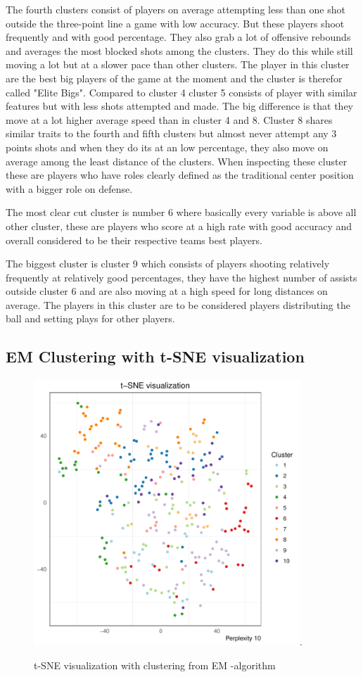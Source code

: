 \documentclass{article}
\begin{document}
The fourth clusters consist of players on average attempting less than one shot outside the three-point line a game with low accuracy. But these players shoot frequently and with good percentage. They also grab a lot of offensive rebounds and averages the most blocked shots among the clusters. They do this while still moving a lot but at a slower pace than other clusters. The player in this cluster are the best big players of the game at the moment and the cluster is therefor called "Elite Bigs". Compared to cluster 4 cluster 5 consists of player with similar features but with less shots attempted and made. The big difference is that they move at a lot higher average speed than in cluster 4 and 8. Cluster 8 shares similar traits to the fourth and fifth clusters but almost never attempt any 3 points shots and when they do its at an low percentage, they also move on average among the least distance of the clusters. When inspecting these cluster these are players who have roles clearly defined as the traditional center position with a bigger role on defense.

The most clear cut cluster is number 6 where basically every variable is above all other cluster, these are players who score at a high rate with good accuracy and overall considered to be their respective teams best players.

The biggest cluster is cluster 9 which consists of players shooting relatively frequently at relatively good percentages, they have the highest number of assists outside cluster 6 and are also moving at a high speed for long distances on average. The players in this cluster are to be considered players distributing the ball and setting plays for other players.

\subsection{EM Clustering with t-SNE visualization}

\begin{figure}[H]
 \centering
 \includegraphics[height=10cm]{tsnecluster2.pdf}.
 \caption{t-SNE visualization with clustering from EM -algorithm}
 \label{figure:2}
\end{figure}
\end{document}
